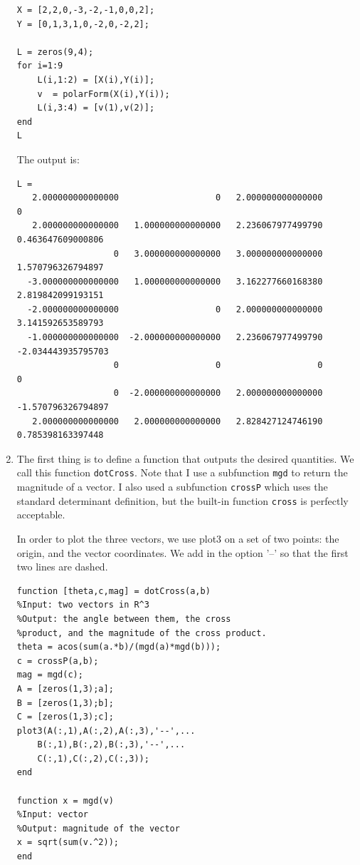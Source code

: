 \documentclass[12pt]{amsart}
\begin{document}
\begin{enumerate}
\begin{verbatim}
X = [2,2,0,-3,-2,-1,0,0,2];
Y = [0,1,3,1,0,-2,0,-2,2];

L = zeros(9,4);
for i=1:9
    L(i,1:2) = [X(i),Y(i)];
    v  = polarForm(X(i),Y(i));
    L(i,3:4) = [v(1),v(2)];
end
L
\end{verbatim}

The output is:
\begin{small}
\begin{verbatim}
L =
   2.000000000000000                   0   2.000000000000000                   0
   2.000000000000000   1.000000000000000   2.236067977499790   0.463647609000806
                   0   3.000000000000000   3.000000000000000   1.570796326794897
  -3.000000000000000   1.000000000000000   3.162277660168380   2.819842099193151
  -2.000000000000000                   0   2.000000000000000   3.141592653589793
  -1.000000000000000  -2.000000000000000   2.236067977499790  -2.034443935795703
                   0                   0                   0                   0
                   0  -2.000000000000000   2.000000000000000  -1.570796326794897
   2.000000000000000   2.000000000000000   2.828427124746190   0.785398163397448
\end{verbatim}
\end{small}
\vspace{1cm}

\item The first thing is to define a function that outputs
the desired quantities. We call this function {\tt dotCross}.
Note that I use a subfunction {\tt mgd} to return the magnitude
of a vector. I also used a subfunction {\tt crossP} which uses
the standard determinant definition, but the built-in function
{\tt cross} is perfectly acceptable.

In order to plot the three vectors, we use plot3 on a set of
two points: the origin, and the vector coordinates. 
We add in the option '--' so that the first two lines are dashed.
\begin{verbatim}
function [theta,c,mag] = dotCross(a,b)
%Input: two vectors in R^3
%Output: the angle between them, the cross
%product, and the magnitude of the cross product.
theta = acos(sum(a.*b)/(mgd(a)*mgd(b)));
c = crossP(a,b);
mag = mgd(c);
A = [zeros(1,3);a];
B = [zeros(1,3);b];
C = [zeros(1,3);c];
plot3(A(:,1),A(:,2),A(:,3),'--',...
    B(:,1),B(:,2),B(:,3),'--',...
    C(:,1),C(:,2),C(:,3));
end

function x = mgd(v)
%Input: vector
%Output: magnitude of the vector
x = sqrt(sum(v.^2));
end


\end{verbatim}
\end{enumerate}
\end{document}
